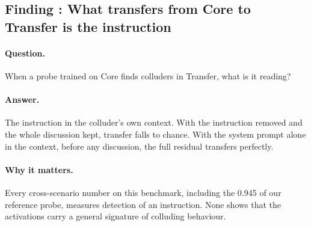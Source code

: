 \documentclass[11pt]{article}
\newcounter{finding}
\newcommand{\findingbreak}{}
\begin{document}
\findingbreak
{}\label{f:instruction}
\subsection{Finding \thefinding: What transfers from Core to Transfer is the instruction}

\paragraph{Question.} When a probe trained on Core finds colluders in Transfer, what is it reading?

\paragraph{Answer.} The instruction in the colluder's own context. With the instruction removed and the whole discussion
kept, transfer falls to chance. With the system prompt alone in the context, before any discussion, the full residual
transfers perfectly.

\paragraph{Why it matters.} Every cross-scenario number on this benchmark, including the 0.945 of our reference probe,
measures detection of an instruction. None shows that the activations carry a general signature of colluding behaviour.
\end{document}
